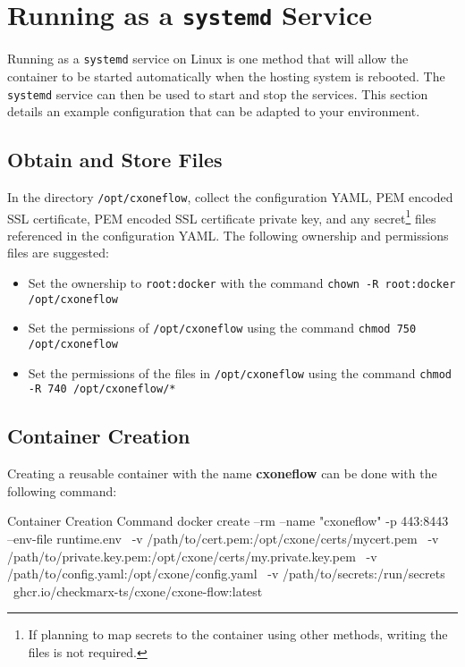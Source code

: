 \chapter{Running \cxoneflow as a \texttt{systemd} Service}


Running \cxoneflow as a \texttt{systemd} service on Linux is one method that
will allow the container to be started automatically when the hosting system
is rebooted.  The \texttt{systemd} service can then be used to start and stop the
\cxoneflow services.  This section details an example configuration that can be adapted
to your environment.


\section{Obtain and Store Files}

In the directory \texttt{/opt/cxoneflow}, collect the configuration YAML, PEM encoded SSL certificate, PEM encoded SSL certificate private key,
and any secret\footnote{If planning to map secrets to the container using other methods, 
writing the files is not required.} files referenced in the configuration YAML.  The following
ownership and permissions files are suggested:

\begin{itemize}
    \item Set the ownership to \texttt{root:docker} with the command \texttt{chown -R root:docker /opt/cxoneflow}
    \item Set the permissions of \texttt{/opt/cxoneflow} using the command \texttt{chmod 750 /opt/cxoneflow}
    \item Set the permissions of the files in \texttt{/opt/cxoneflow} using the command
    \texttt{chmod -R 740 /opt/cxoneflow/*}
\end{itemize}


\section{Container Creation}

Creating a reusable container with the name \textbf{cxoneflow} can be done with the following
command:

\begin{code}{Container Creation Command}{}{}
docker create --rm --name "cxoneflow" -p 443:8443 --env-file runtime.env \
  -v /path/to/cert.pem:/opt/cxone/certs/mycert.pem \
  -v /path/to/private.key.pem:/opt/cxone/certs/my.private.key.pem \
  -v /path/to/config.yaml:/opt/cxone/config.yaml \
  -v /path/to/secrets:/run/secrets \
  ghcr.io/checkmarx-ts/cxone/cxone-flow:latest
\end{code}

